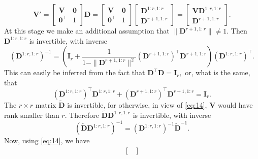 \documentclass[11pt,a4paper]{article}
\theoremstyle{break}
\numberwithin{dummy}{section}
\theoremstyle{plain}
\theoremstyle{plain}
\theoremstyle{plain}
\theoremstyle{plain}
\theoremstyle{plain}
\theoremstyle{MyNonumberplain}
\newcommand{\0}{\M{0}}
\newcommand{\M}[1]{\mathbf{#1}}
\newcommand{\Mt}[1]{\tilde{\M{#1}}}
\newcommand{\T}{\top}
\begin{document}
\begin{enumerate}[font=\upshape,label=(\roman*),wide,align=right]
  \begin{displaymath}
    \M{V}' =
    \begin{bmatrix}
      \M{V} & \0
      \\
      \0^\T & 1
    \end{bmatrix}
    \M{D}
    =
    \begin{bmatrix}
      \M{V} & \0
      \\
      \0^\T & 1
    \end{bmatrix}
    \begin{bmatrix}
      \M{D}^{1:r,1:r}
      \\
      \M{D}^{r+1,1:r}
    \end{bmatrix}
    =
    \begin{bmatrix}
      \M{V} \M{D}^{1:r,1:r}
      \\
      \M{D}^{r+1,1:r}
    \end{bmatrix}.
  \end{displaymath}
  At this stage we make an additional assumption that $\| \M{D}^{r+1,1:r} \| \neq 1$. Then $\M{D}^{1:r,1:r}$ is invertible, with inverse
  \begin{displaymath}
    (\M{D}^{1:r,1:r})^{-1}
    = \left(
      \M{I}_r
      + \frac{1}{1 - \| \M{D}^{r+1,1:r} \| ^2}
      \left(\M{D}^{r+1,1:r}\right)^\T
      \M{D}^{r+1,1:r}
    \right)
    \left(\M{D}^{1:r,1:r}\right)^\T.
  \end{displaymath}
  This can easily be inferred from the fact that
  \begin{math}
    \M{D}^\T \M{D} = \M{I}_r,
  \end{math}
  or, what is the same, that
  \begin{displaymath}
    \left(\M{D}^{1:r,1:r}\right)^\T\M{D}^{1:r,1:r}
    +
    \left(\M{D}^{r+1,1:r}\right)^\T
    \M{D}^{r+1,1:r}
    =
    \M{I}_r.
  \end{displaymath}
  The $r \times r$ matrix $\Mt{D}$ is invertible, for otherwise, in view of \eqref{eq:14}, $\M{V}$ would have rank smaller than $r$. Therefore
  \begin{math}
    \Mt{D} \M{D}^{1:r,1:r}
  \end{math}
  is invertible, with inverse
  \begin{displaymath}
    \left(\Mt{D} \M{D}^{1:r,1:r}\right)^{-1}
    =
    \left(\M{D}^{1:r,1:r}\right)^{-1}
    \Mt{D}^{-1}.
  \end{displaymath}
  Now, using \eqref{eq:14}, we have
  \begin{align*}
        \begin{bmatrix}

\end{bmatrix}
\end{align*}
\end{enumerate}
\end{document}
